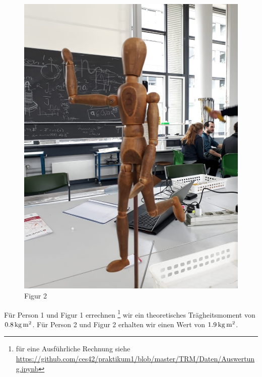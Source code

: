 \begin{figure}
\begin{minipage}{.49\textwidth}
    \includegraphics[scale=.28]{./Bilder/figur2.jpeg}
    \caption{Figur 2}
\end{minipage}
\end{figure}

Für Person 1 und Figur 1 errechnen%
\footnote{für eine Ausführliche Rechnung siehe \url{https://github.com/ces42/praktikum1/blob/master/TRM/Daten/Auswertung.ipynb}}
wir ein theoretisches Trägheitsmoment von  $\unit[0.8]{kg\,m^2}$. Für Person 2 und Figur 2 erhalten wir einen Wert von $\unit[1.9]{kg\,m^2}$. 



